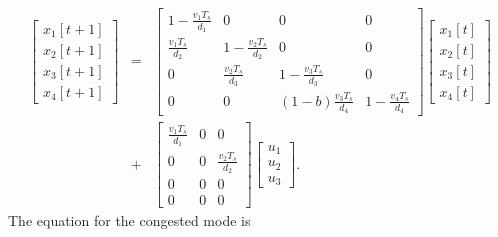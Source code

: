 \begin{eqnarray}
\left[\begin{array}{c}
x_1[t+1]\\
x_2[t+1]\\
x_3[t+1]\\
x_4[t+1]\end{array}\right] & = & \left[\begin{array}{cccc}
1-\frac{v_1T_s}{d_1} & 0 & 0 & 0\\
\frac{v_1T_s}{d_2} & 1-\frac{v_2T_s}{d_2} & 0 & 0\\
0 & \frac{v_2T_s}{d_3} & 1-\frac{v_3T_s}{d_3} & 0\\
0 & 0 & (1-b)\frac{v_3T_s}{d_4} & 1-\frac{v_4T_s}{d_4}\end{array}\right]
\left[\begin{array}{c}
x_1[t]\\
x_2[t]\\
x_3[t]\\
x_4[t]\end{array}\right] \nonumber\\
& + & \left[\begin{array}{ccc}
\frac{v_1T_s}{d_1} & 0 & 0\\
0 & 0 & \frac{v_2T_s}{d_2}\\
0 & 0 & 0\\
0 & 0 & 0\end{array}\right]\left[\begin{array}{c}
u_1\\
u_2\\
u_3\end{array}\right]. \label{fflow}
\end{eqnarray}
The equation for the congested mode is
